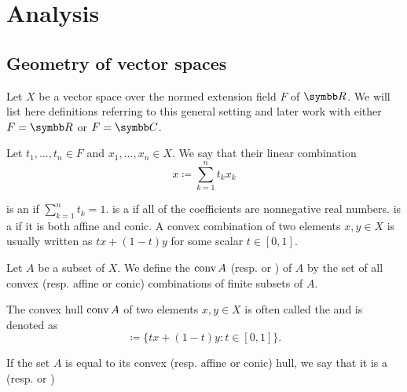 \section{Analysis}\label{sec:analysis}
\subsection{Geometry of vector spaces}\label{subsec:geometry_of_vector_spaces}

\begin{remark}\label{remark:geometry_of_vector_spaces}
  Let \( X \) be a vector space over the normed extension field \( F \) of \( \R \). We will list here definitions referring to this general setting and later work with either \( F = \R \) or \( F = \BB{C} \).
\end{remark}

\begin{definition}\label{def:special_linear_combinations}
  Let \( t_1, \ldots, t_n \in F \) and \( x_1, \ldots, x_n \in X \). We say that their linear combination
  \begin{equation*}
    x \coloneqq \sum_{k=1}^n t_k x_k
  \end{equation*}

  \begin{defenum}
     is an  if \( \sum_{k=1}^n t_k = 1 \).
     is a  if all of the coefficients are nonnegative real numbers.
     is a  if it is both affine and conic. A convex combination of two elements \( x, y \in X \) is usually written as \( tx + (1-t)y \) for some scalar \( t \in [0, 1] \).
  \end{defenum}
\end{definition}

\begin{definition}\label{def:linear_combination_hulls}
  Let \( A \) be a subset of \( X \). We define the  \( \operatorname{conv} A \) (resp.  or ) of \( A \) by the set of all convex (resp. affine or conic) combinations of finite subsets of \( A \).

  The convex hull \( \operatorname{conv} A \) of two elements \( x, y \in X \) is often called the  and is denoted as
  \begin{equation*}
    [x, y] \coloneqq \{ tx + (1-t)y \colon t \in [0, 1] \}.
  \end{equation*}

  If the set \( A \) is equal to its convex (resp. affine or conic) hull, we say that it is a  (resp.  or )
\end{definition}

